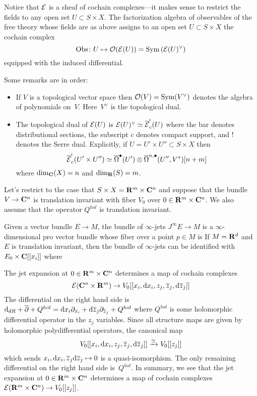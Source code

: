 Notice that $\mathcal E$ is a sheaf of cochain complexes---it makes sense to restrict the fields to any open set $U \subset S \times X$. 
The factorization algebra of observables of the free theory whose fields are as above assigns to an open set $U \subset S \times X$ the cochain complex
\[
\operatorname{Obs} \colon U \mapsto \mathcal O(\mathcal E(U)) = \operatorname{Sym} \left(\mathcal E(U)^\vee \right) 
\]
equipped with the induced differential.

Some remarks are in order:
\begin{itemize}
\item If $V$ is a topological vector space then $\mathcal O(V) = \operatorname{Sym}(V^\vee)$ denotes the algebra of polynomials on~$V$.
Here~$V^\vee$ is the topological dual.
\item The topological dual of $\mathcal E(U)$ is $\mathcal E(U)^\vee \simeq \overline{\mathcal E}^!_c(U)$ where the bar denotes distributional sections, the subscript $c$ denotes compact support, and $!$ denotes the Serre dual. 
Explicitly, if $U = U' \times U'' \subset S \times X$ then 
\[
\overline{\mathcal E}^!_c(U' \times U'') \simeq \overline{\Omega}^\bullet(U') \otimes \overline{\Omega}^{n,\bullet}(U'',V^*)[n+m] 
\]
where $\dim_{\mathbf{C}} (X) = n$ and $\dim_{\mathbf{R}} (S) = m$. 
\end{itemize}

Let's restrict to the case that $S \times X = \mathbf{R}^m \times \mathbf{C}^n$ and suppose that the bundle $V \to \mathbf{C}^n$ is translation invariant with fiber $V_0$ over $0 \in \mathbf{R}^m \times \mathbf{C}^n$.
We also assume that the operator $Q^{hol}$ is translation invariant. 

Given a vector bundle $E \to M$, the bundle of $\infty$-jets $J^\infty E \to M$ is a $\infty$-dimensional pro vector bundle whose fiber over a point $p \in M$ is 
If $M = \mathbf{R}^d$ and $E$ is translation invariant, then the bundle of $\infty$-jets can be identified with $E_0 \times \mathbf{C}[[x_i]]$ where  
 
The jet expansion at $0 \in \mathbf{R}^m \times \mathbf{C}^n$ determines a map of cochain complexes
\[
\mathcal E(\mathbf{C}^n \times \mathbf{R}^m) \to V_0 [[x_i, {\rm d} x_i,z_j, \overline{z}_j, {\rm d} \overline{z}_j]] 
\]
The differential on the right hand side is ${\rm d}_{dR} + \overline{\partial} + Q^{hol} = {\rm d} x_i \partial_{x_i} + {\rm d} \overline{z}_j \partial_{\overline{z}_j} + Q^{hol}$ where $Q^{hol}$ is some holomorphic differential operator in the $z_j$ variables. 
Since all structure maps are given by holomorphic polydifferential operators, the canonical map 
\[
V_0 [[x_i, {\rm d} x_i,z_j, \overline{z}_j, {\rm d} \overline{z}_j]] \xrightarrow{\simeq} V_0 [[z_j]] 
\]
which sends $x_i, {\rm d} x_i,\overline{z}_j {\rm d} \overline{z}_j \mapsto 0$ is a quasi-isomorphism. 
The only remaining differential on the right hand side is~$Q^{hol}$. 
In summary, we see that the jet expansion at $0 \in \mathbf{R}^m \times \mathbf{C}^n$ determines a map of cochain complexes $\mathcal E(\mathbf{R}^m \times \mathbf{C}^n) \to V_0[[z_j]]$. 

